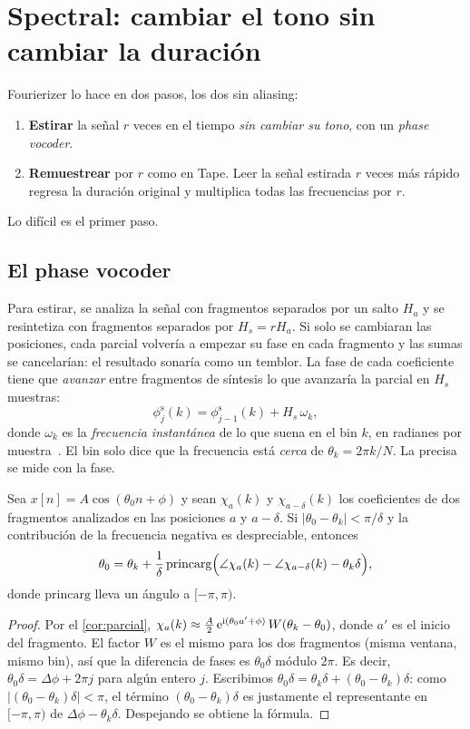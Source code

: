 \section{Spectral: cambiar el tono sin cambiar la duración}

Fourierizer lo hace en dos pasos, los dos sin aliasing:
\begin{enumerate}
  \item \textbf{Estirar} la señal $r$ veces en el tiempo \emph{sin cambiar su tono}, con un
        \emph{phase vocoder}.
  \item \textbf{Remuestrear} por $r$ como en Tape. Leer la señal estirada $r$ veces más rápido
        regresa la duración original y multiplica todas las frecuencias por $r$.
\end{enumerate}
Lo difícil es el primer paso.

\subsection{El phase vocoder}

Para estirar, se analiza la señal con fragmentos separados por un salto $H_a$ y se resintetiza con
fragmentos separados por $H_s=rH_a$. Si solo se cambiaran las posiciones, cada parcial volvería a
empezar su fase en cada fragmento y las sumas se cancelarían: el resultado sonaría como un
temblor. La fase de cada coeficiente tiene que \emph{avanzar} entre fragmentos de síntesis lo que
avanzaría la parcial en $H_s$ muestras:
\[
  \phi^{\text{s}}_{j}(k)=\phi^{\text{s}}_{j-1}(k)+H_s\,\omega_k,
\]
donde $\omega_k$ es la \emph{frecuencia instantánea} de lo que suena en el bin $k$, en radianes
por muestra~\cite{flanagan1966}. El bin solo dice que la frecuencia está \emph{cerca} de
$\theta_k=2\pi k/N$. La precisa se mide con la fase.

\begin{proposicion}\label{prop:frecuencia-instantanea}
Sea $x[n]=A\cos(\theta_0n+\phi)$ y sean $\chi_a(k)$ y $\chi_{a-\delta}(k)$ los coeficientes de dos
fragmentos analizados en las posiciones $a$ y $a-\delta$. Si $|\theta_0-\theta_k|<\pi/\delta$ y la
contribución de la frecuencia negativa es despreciable, entonces
\[
  \theta_0=\theta_k+\frac{1}{\delta}\,\mathrm{princarg}\Bigl(\angle\chi_a(k)-\angle\chi_{a-\delta}(k)-\theta_k\delta\Bigr),
\]
donde $\mathrm{princarg}$ lleva un ángulo a $[-\pi,\pi)$.
\end{proposicion}

\begin{proof}
Por el \cref{cor:parcial}, $\chi_a(k)\approx\tfrac A2\,\mathrm{e}^{\mathrm{i}(\theta_0 a'+\phi)}\,W(\theta_k-\theta_0)$, donde
$a'$ es el inicio del fragmento. El factor $W$ es el mismo para los dos fragmentos (misma ventana,
mismo bin), así que la diferencia de fases es $\theta_0\delta$ módulo $2\pi$. Es decir,
$\theta_0\delta=\Delta\phi+2\pi j$ para algún entero $j$. Escribimos
$\theta_0\delta=\theta_k\delta+(\theta_0-\theta_k)\delta$: como $|(\theta_0-\theta_k)\delta|<\pi$,
el término $(\theta_0-\theta_k)\delta$ es justamente el representante en $[-\pi,\pi)$ de
$\Delta\phi-\theta_k\delta$. Despejando se obtiene la fórmula.
\end{proof}

